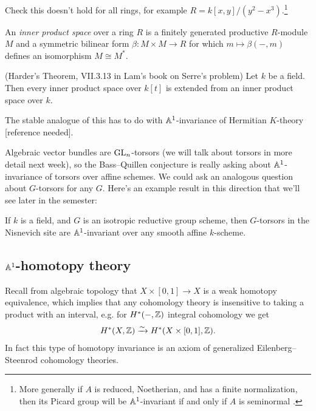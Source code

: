 \documentclass[11pt]{amsart}
\begin{document}
\begin{example} \cite[3.7.1.5]{Aravind}
Check this doesn't hold for all rings, for example $R = k[x,y]/(y^2-x^3)$.\footnote{%
More generally if $A$ is reduced, Noetherian, and has a finite normalization, then its Picard group will be $\mathbb{A}^1$-invariant if and only if $A$ is seminormal \cite[3.6]{Traverso}.
}
\end{example}

\begin{definition} An \textit{inner product space} over a ring $R$ is a finitely generated productive $R$-module $M$ and a symmetric bilinear form $\beta \colon M \times M \to R$ for which $m \mapsto \beta(-,m)$ defines an isomorphism $M \cong M^\ast$.
\end{definition}


\begin{theorem} (Harder's Theorem, VII.3.13 in Lam's book on Serre's problem) Let $k$ be a field. Then every inner product space over $k[t]$ is extended from an inner product space over $k$.
\end{theorem}

\begin{remark} The stable analogue of this has to do with $\mathbb{A}^1$-invariance of Hermitian $K$-theory [reference needed].
\end{remark}



Algebraic vector bundles are $\mathrm{GL}_n$-torsors (we will talk about torsors in more detail next week), so the Bass--Quillen conjecture is really asking about $\mathbb{A}^1$-invariance of torsors over affine schemes. We could ask an analogous question about $G$-torsors for any $G$. Here's an example result in this direction that we'll see later in the semester:

\begin{theorem} \cite[1.3]{AHW3} If $k$ is a field, and $G$ is an isotropic reductive group scheme, then $G$-torsors in the Nisnevich site are $\mathbb{A}^1$-invariant over any smooth affine $k$-scheme.
\end{theorem}

\subsection{$\mathbb{A}^1$-homotopy theory}

Recall from algebraic topology that $X \times [0,1] \to X$ is a weak homotopy equivalence, which implies that any cohomology theory is insensitive to taking a product with an interval, e.g. for $H^\ast(-,\mathbb{Z})$ integral cohomology we get
\begin{align*}
    H^\ast(X,\mathbb{Z}) \xrightarrow{\sim} H^\ast(X \times [0,1],\mathbb{Z}).
\end{align*}
In fact this type of homotopy invariance is an axiom of generalized Eilenberg--Steenrod cohomology theories.
\end{document}
